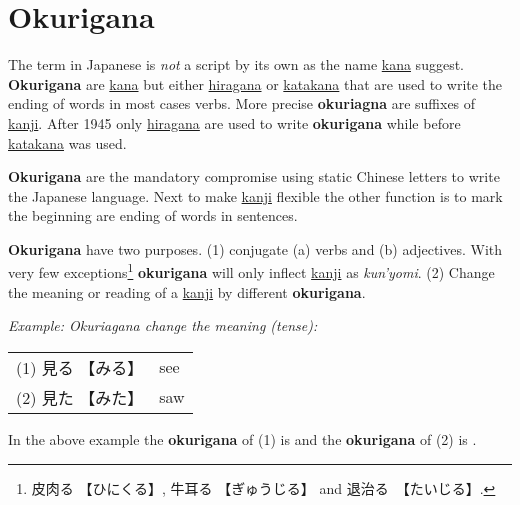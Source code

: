 \section{Okurigana}
\label{sec:Okurigana}
\label{sec:Nokurigana}

The term  in Japanese is
\textit{not} a script by its own as the name \hyperref[sec:Kana]{kana} suggest.
\textbf{Okurigana} are \hyperref[sec:Kana]{kana} but either
\hyperref[sec:Hiragana]{hiragana} or \hyperref[sec:Katakana]{katakana} that are
used to write the ending of words in most cases verbs. More precise
\textbf{okuriagna} are suffixes of \hyperref[sec:Kanji]{kanji}. After 1945 only
\hyperref[sec:Hiragana]{hiragana} are used to write \textbf{okurigana} while
before \hyperref[sec:Katakana]{katakana} was used.

\textbf{Okurigana} are the mandatory compromise using static Chinese letters to
write the Japanese language. Next to make \hyperref[sec:Kanji]{kanji} flexible
the other function is to mark the beginning are ending of words in sentences.

\textbf{Okurigana} have two purposes. (1) conjugate (a) verbs and (b)
adjectives. With very few exceptions\footnote{ {皮肉る} {【ひにくる】},
{牛耳る}  {【ぎゅうじる】} and {退治る}　{【たいじる】}.}  \textbf{okurigana}
will only inflect \hyperref[sec:Kanji]{kanji} as \textit{kun'yomi}.  (2) Change
the meaning or reading of a \hyperref[sec:Kanji]{kanji} by different
\textbf{okurigana}.

\textit{Example: Okuriagana change the meaning (tense):}

\medskip
\begin{tabular}{ll}
\hspace{2cm}(1) {見る} {【みる】} & see \\
\hspace{2cm}(2) {見た} {【みた】} & saw \\
\end{tabular}

\medskip
In the above example the \textbf{okurigana} of (1) is  and the
\textbf{okurigana} of (2) is .

